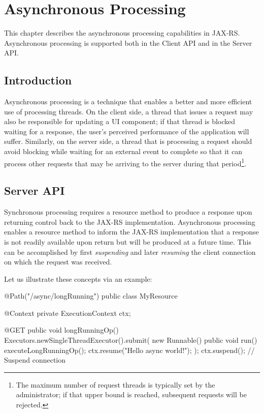 \chapter{Asynchronous Processing}
\label{asynchronous_processing}

This chapter describes the asynchronous processing capabilities in JAX-RS. Asynchronous processing is supported both in the Client API and in the Server API.

\section{Introduction}
\label{introduction_async}

Asynchronous processing is a technique that enables a better and more efficient use of processing threads. On the client side, a thread that issues a request may also be responsible for updating a UI component; if that thread is blocked waiting for a response, the user's perceived performance of the application will suffer. Similarly, on the server side, a thread that is processing a request should avoid blocking while waiting for an external event to complete so that it can process other requests that may be arriving to the server during that period\footnote{The maximum number of request threads is typically set by the administrator; if that upper bound is reached, subsequent requests will be rejected.}.

\section{Server API}
\label{server_api}

Synchronous processing requires a resource method to produce a response upon returning control back to the JAX-RS implementation. Asynchronous processing enables a resource method to inform the JAX-RS implementation that a response is not readily available upon return but will be produced at a future time. This can be accomplished by first {\em suspending} and later {\em resuming} the client connection on which the request was received. 

Let us illustrate these concepts via an example:

\begin{listing}{1}
@Path("/async/longRunning")
public class MyResource {
    @Context
    private ExecutionContext ctx;
    
    @GET
    public void longRunningOp() {
        Executors.newSingleThreadExecutor().submit(
            new Runnable() {
                public void run() {
                    executeLongRunningOp();
                    ctx.resume("Hello async world!");
        } });
        ctx.suspend();    // Suspend connection
    } 
}
\end{listing}

